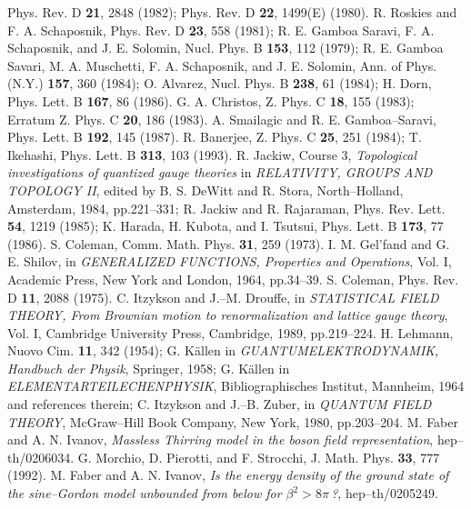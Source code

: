 \documentclass[a4paper,12pt] {article}
\begin{document}
\begin{thebibliography}{9}
Phys. Rev. D {\bf 21}, 2848 (1982); Phys. Rev. D {\bf 22}, 1499(E)
(1980).
\bibitem{[20]}
R. Roskies and F. A. Schaposnik,
Phys. Rev. D {\bf 23}, 558 (1981);
R. E. Gamboa Saravi, F. A. Schaposnik, and J. E. Solomin,
Nucl. Phys. B {\bf 153}, 112 (1979);
R. E. Gamboa Savari, M. A. Muschetti, F. A. Schaposnik, 
and J. E. Solomin,
Ann. of Phys. (N.Y.) {\bf 157}, 360 (1984);
O. Alvarez,
Nucl. Phys. B {\bf 238}, 61 (1984);
H. Dorn,
Phys. Lett. B {\bf 167}, 86 (1986).
\bibitem{[21]}
G. A. Christos,
Z. Phys. C {\bf 18}, 155 (1983); 
Erratum Z. Phys. C {\bf 20}, 186 (1983).
\bibitem{[22]}
A. Smailagic and R. E. Gamboa--Saravi,
Phys. Lett. B {\bf 192}, 145 (1987).
\bibitem{[23]}
R. Banerjee,
Z. Phys. C {\bf 25}, 251 (1984);
T. Ikehashi,
Phys. Lett. B {\bf 313}, 103 (1993).
\bibitem{[24]}
R. Jackiw, 
Course 3, {\it Topological investigations of quantized 
gauge theories} in {\it RELATIVITY, GROUPS AND TOPOLOGY II}, 
edited by B. S. DeWitt and R. Stora, North--Holland, 
Amsterdam, 1984, pp.221--331;
R. Jackiw and R. Rajaraman,
Phys. Rev. Lett. {\bf 54}, 1219 (1985);
K. Harada, H. Kubota, and I. Tsutsui,
Phys. Lett. B {\bf 173}, 77 (1986).
\bibitem{[25]}
S. Coleman,
Comm. Math. Phys. {\bf 31}, 259 (1973).
\bibitem{[26]}
I. M. Gel'fand and G. E. Shilov,
in {\it GENERALIZED FUNCTIONS, Properties and Operations}, Vol. I, 
Academic Press, New York and London, 1964, pp.34--39.
\bibitem{[27]}
S. Coleman,
Phys. Rev. D {\bf 11}, 2088 (1975).
\bibitem{[28]}
C. Itzykson and J.--M. Drouffe,
in {\it STATISTICAL FIELD THEORY, From Brownian motion to 
renormalization and lattice gauge theory}, Vol. I, Cambridge 
University Press, Cambridge, 1989, pp.219--224.
\bibitem{[29]}
H. Lehmann,
Nuovo Cim. {\bf 11}, 342 (1954);
G. K\"allen in 
{\it GUANTUMELEKTRODYNAMIK, Handbuch der Physik}, Springer, 1958;
G. K\"allen in
{\it ELEMENTARTEILECHENPHYSIK}, Bibliographisches Institut, 
Mannheim,
1964 and references therein;
C. Itzykson and J.--B. Zuber,
in {\it QUANTUM FIELD THEORY}, McGraw--Hill Book Company, 
New York, 1980, pp.203--204.
\bibitem{[30]}
M. Faber and A. N. Ivanov,
{\it Massless Thirring model in the boson field representation},
 hep--th/0206034.
\bibitem{[31]}
G. Morchio, D. Pierotti, and F. Strocchi,
J. Math. Phys. {\bf 33}, 777 (1992).
\bibitem{[32]}
M. Faber and A. N. Ivanov,
{\it Is the energy density of the ground state of the sine--Gordon
model unbounded from below for $\beta^2 > 8\pi$\,?}, 
hep--th/0205249.
\end{thebibliography}
\end{document}
